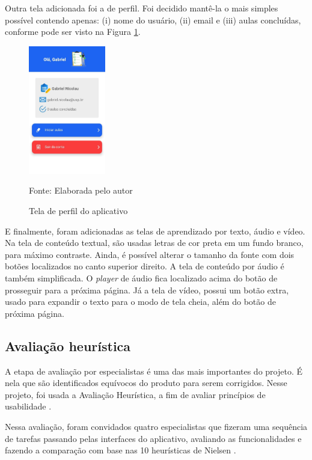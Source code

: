 Outra tela adicionada foi a de perfil. Foi decidido mantê-la o mais simples possível contendo apenas: (i) nome do usuário, (ii) email e (iii) aulas concluídas, conforme pode ser visto na Figura \ref{fig:perfil}.

\begin{figure}[H]
\centering
    \caption{Tela de perfil do aplicativo}
    \label{fig:perfil}
    \includegraphics[width=0.3\textwidth]{Figuras/profile.jpg}
    
    Fonte: Elaborada pelo autor
\end{figure}

E finalmente, foram adicionadas as telas de aprendizado por texto, áudio e vídeo.
Na tela de conteúdo textual, são usadas letras de cor preta em um fundo branco, para máximo contraste. Ainda, é possível alterar o tamanho da fonte com dois botões localizados no canto superior direito.
A tela de conteúdo por áudio é também simplificada. O \textit{player} de áudio fica localizado acima do botão de prosseguir para a próxima página.
Já a tela de vídeo, possui um botão extra, usado para expandir o texto para o modo de tela cheia, além do botão de próxima página. 

\subsection{Avaliação heurística}
\label{sec:avaliacao-heuristica}
A etapa de avaliação por especialistas é uma das mais importantes do projeto. É nela que são identificados equívocos do produto para serem corrigidos. Nesse projeto, foi usada a Avaliação Heurística, a fim de avaliar princípios de usabilidade \citep{nielsen1994inspection}.

Nessa avaliação, foram convidados quatro especialistas que fizeram uma sequência de tarefas passando pelas interfaces do aplicativo, avaliando as funcionalidades e fazendo a comparação com base nas 10 heurísticas de Nielsen \citep{nielsen1994usability}.

